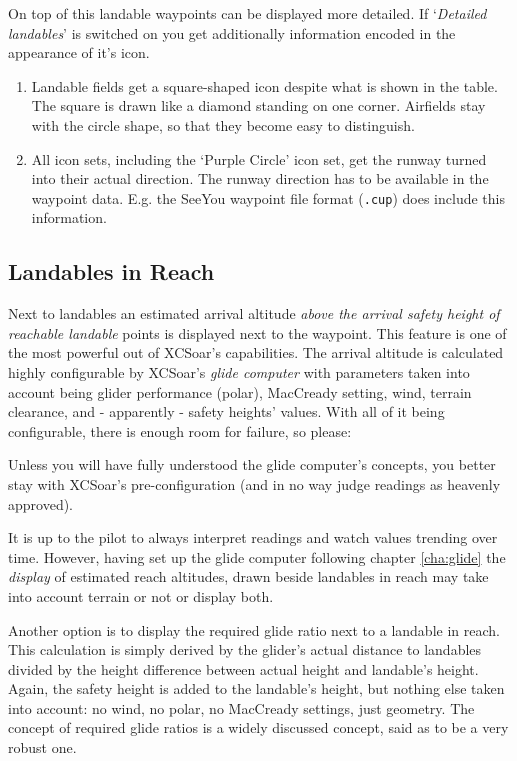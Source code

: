 On top of this landable waypoints can be displayed more detailed. If 
`{\it Detailed landables}' is switched on you get additionally information 
encoded in the appearance of it's icon. 
\begin{enumerate}
\item  Landable fields get a square-shaped icon despite what is shown in the table.
  The square is drawn like a diamond standing on one corner. Airfields stay with the 
  circle shape, so that they become easy to distinguish.
\item  All icon sets, including the `Purple Circle' icon set, get the 
  runway turned into their actual direction. The runway direction has to be available in 
  the waypoint data. E.g. the SeeYou waypoint file format (\verb|.cup|) does 
  include this information.  
\end{enumerate}

\subsection*{Landables in Reach}
Next to landables an estimated arrival altitude
\emph{above the arrival safety height of reachable landable} points is
displayed next to the waypoint. This feature is one of the most powerful out 
of XCSoar's capabilities. The arrival altitude is calculated highly 
configurable by XCSoar's \emph{glide computer} with parameters taken into 
account being glider performance (polar), MacCready setting, wind, terrain 
clearance, and - apparently - safety heights' values.  With all of it being 
configurable, there is enough room for failure, so please:

Unless you will have fully understood the glide computer's concepts, you 
\warning
better stay with XCSoar's pre-configuration (and in no way judge readings as 
heavenly approved).

It is up to the pilot to always interpret readings and watch values trending 
over time.  However, having set up the glide computer following chapter 
\ref{cha:glide} the \emph{display} of estimated reach altitudes, drawn beside 
landables in reach may take into account terrain or not or display both.

Another option is to display the required glide ratio next to a landable in 
reach. This calculation is simply derived by the glider's actual distance to 
landables divided by the height difference between actual height and 
landable's height.  Again, the safety height is added to the landable's 
height, but nothing else taken into account: no wind, no polar, no MacCready 
settings, just geometry. The concept of required glide ratios is a widely 
discussed concept, said as to be a very robust one.

